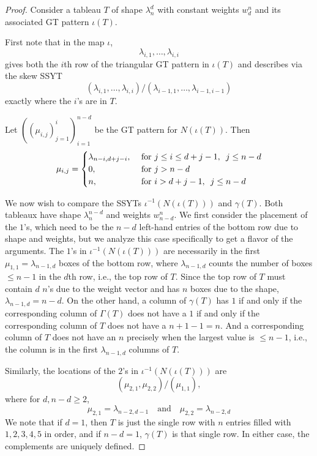 \documentclass[10pt]{article}
\theoremstyle{plain}
\theoremstyle{definition}
\begin{document}
\begin{proof}\label{proof1}
Consider a tableau $T$ of shape $\lambda_n^d$ with constant weights $w_d^n$ and its associated GT pattern $\iota(T)$. 

First note that in the map $\iota$, 
\[
\lambda_{i,1}, \hdots, \lambda_{i,i}
\]
gives both the $i$th row of the triangular GT pattern in $\iota(T)$ and describes via the skew SSYT
\[
(\lambda_{i,1}, \hdots, \lambda_{i,i})/(\lambda_{i-1,1}, \hdots, \lambda_{i-1,i-1})
\]
exactly where the $i$'s are in $T$.

Let $\left((\mu_{i,j})_{j=1}^i\right)_{i=1}^{n-d}$ be the GT pattern for $N\left(\iota(T)\right)$.  Then
\[
\mu_{i,j} = \begin{cases}
\lambda_{n-i, d+j-i}, & \text{ for } j \leq i \leq d+j-1, \enskip j \leq n-d  \\
0, & \text{ for } j > n-d \\
n, & \text{ for } i > d+j-1,\enskip j \leq n-d \\
\end{cases}
\]

We now wish to compare the SSYTs $\iota^{-1}\left(N\left(\iota(T)\right)\right)$ and $\gamma(T)$. Both tableaux have shape $\lambda_n^{n-d}$ and weights $w_{n-d}^n$. We first consider the placement of the $1$'s, which need to be the $n-d$ left-hand entries of the bottom row due to shape and weights, but we analyze this case specifically to get a flavor of the arguments.  The $1$'s in $\iota^{-1}\left(N\left(\iota(T)\right)\right)$ are necessarily in the first $\mu_{1,1}=\lambda_{n-1,d}$ boxes of the bottom row, where $\lambda_{n-1,d}$ counts the number of boxes $\leq n-1$ in the $d$th row, i.e., the top row of $T$.  Since the top row of $T$ must contain $d$ $n$'s due to the weight vector and has $n$ boxes due to the shape, $\lambda_{n-1,d}=n-d$.  On the other hand, a column of $\gamma(T)$ has $1$ if and only if the corresponding column of $\Gamma(T)$ does not have a $1$ if and only if the corresponding column of $T$ does not have a $n+1-1=n$.  And a corresponding column of $T$ does not have an $n$ precisely when the largest value is $\leq n-1$, i.e., the column is in the first $\lambda_{n-1,d}$ columns of $T$.

Similarly, the locations of the $2$'s in $\iota^{-1}\left(N\left(\iota(T)\right)\right)$ are
\[
(\mu_{2,1},\mu_{2,2})/(\mu_{1,1}),
\]
where for $d, n-d\geq 2$,
\[
\mu_{2,1} = \lambda_{n-2,d-1} \quad \textrm{and} \quad \mu_{2,2} = \lambda_{n-2,d}
\]
We note that if $d=1$, then $T$ is just the single row with $n$ entries filled with $1, 2, 3, 4, 5$ in order, and if $n-d=1$, $\gamma(T)$ is that single row.  In either case, the complements are uniquely defined.


\end{proof}
\end{document}
